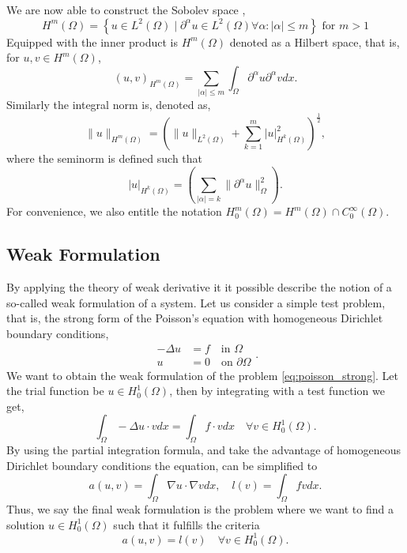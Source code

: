 We are now able to construct the Sobolev space \cite{manzoni2021optimal}, \[
H^{m}\left( \Omega  \right) = \left\{ u \in L^{2}\left( \Omega  \right)  \mid  \partial ^{\alpha } u \in L^{2}\left( \Omega  \right)  \forall \alpha : \left\lvert \alpha  \right\rvert  \le m \right\} \text{ for } m>1
\]
Equipped with the inner product is $H^{m}\left( \Omega  \right) $  denoted as a Hilbert space, that is, for $u,v \in H^{m}\left( \Omega  \right) $, \[
    \left( u,v \right) _{H^{m}\left( \Omega   \right) } = \sum_{\left\lvert \alpha  \right\rvert  \le  m}^{}  \int_{\Omega }^{} \partial ^{\alpha } u \partial ^{\alpha } v dx.
\]
Similarly the integral norm is, denoted as, \[
\| u \|_{ H^{m}\left( \Omega  \right)  }^{  }  = \left( \| u \|_{ L^{2}\left( \Omega  \right)    } + \sum_{k = 1}^{m}  \left\lvert u \right\rvert ^{2} _{  H^{k}\left( \Omega  \right) }\right) ^{\frac{1}{2}},
\]
where the seminorm is defined such that \[
\left\lvert u \right\rvert _{H^{k}\left( \Omega  \right) } = \left( \sum_{\left\lvert \alpha  \right\rvert  = k}^{} \| \partial ^{\alpha }u \|_{ \Omega  }^{ 2 }  \right).
\]
For convenience, we also entitle the notation $H^{m}_{0} \left( \Omega  \right) = H^{m} \left( \Omega  \right) \cap C^{\infty}_{0} \left( \Omega  \right) $.


\subsection{Weak Formulation}%
\label{sub:weak_formulation}

By applying the theory of weak derivative it it possible describe the notion of a so-called weak formulation of a system. Let us consider a simple test problem, that is, the strong form of the Poisson's equation with homogeneous Dirichlet boundary
conditions,
\begin{equation}
\label{eq:poisson_strong}
\begin{split}
-\Delta u & = f \quad \text{in } \Omega \\
u & =0 \quad \text{on } \partial \Omega
\end{split}
.\end{equation}
We want to obtain the weak formulation of the problem \eqref{eq:poisson_strong}. Let the trial function be $u \in H_{0}^{1}\left( \Omega  \right) $, then by integrating with a test function we get, \[
\int_{\Omega }^{} - \Delta u \cdot v dx = \int_{\Omega }^{} f \cdot v dx \quad \forall v \in H^{1}_{0}\left( \Omega  \right).
\]
By using the partial integration formula, and take the advantage of homogeneous Dirichlet boundary conditions the equation, can be simplified to \[
a\left( u,v \right) = \int_{\Omega }^{}  \nabla u\cdot \nabla v dx , \quad l\left( v \right)  = \int_{\Omega }^{}  f v dx.
\]
Thus, we say the final weak formulation is the problem where we want to find a solution $u \in H^{1}_{0}\left( \Omega  \right) $  such that it fulfills the criteria
\begin{equation}
\label{eq:poissons_weak_formulation}
a\left( u,v \right) = l\left( v \right) \quad \forall v \in H^{1}_{0}\left( \Omega  \right).
\end{equation}

